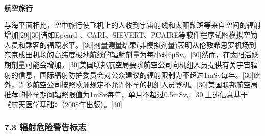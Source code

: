 \textbf{航空旅行}

与海平面相比，空中旅行使飞机上的人收到宇宙射线和太阳耀斑等来自空间的辐射增加[29][30]诸如Epcard 、CARI、SIEVERT、PCAIRE等软件程序试图模拟空勤人员和乘客的辐照水平。[30]剂量测量结果(非模拟剂量)表明从伦敦希思罗机场到东京成田机场的高纬度极地航线的辐射剂量为每小时6μSv。[30]然而，在太阳活跃期剂量可能会增加。[30]美国联邦航空局要求航空公司向机组人员提供有关宇宙辐射的信息，国际辐射防护委员会对公众建议的辐射限制为不超过1mSv每年。[30]此外，许多航空公司按照欧洲规定不允许怀孕的机组人员登机。[30]美国联邦航空局推荐的怀孕期间辐照限值为1mSv每年，单月不超过0.5mSv。[30]上述信息基于《航天医学基础》（2008年出版）。[30]

\subsubsection{7.3 辐射危险警告标志}

